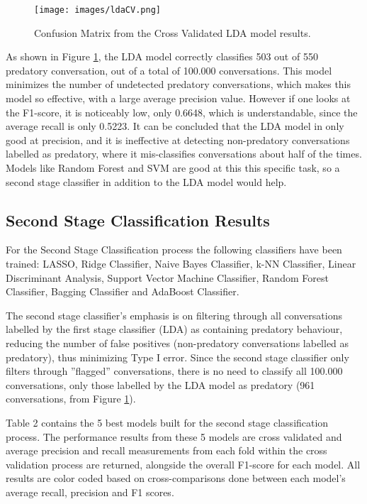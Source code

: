 \documentclass[11pt]{article}
\begin{document}
\begin{figure}[h!]
    \centering
    \texttt{[image: images/ldaCV.png]}
    \caption{Confusion Matrix from the Cross Validated LDA model results.}
    \label{fig:ldaCV}
\end{figure}

As shown in Figure \ref{fig:ldaCV}, the LDA model correctly classifies 503 out of 550 predatory conversation, out of a total of 100.000 conversations. This model minimizes the number of undetected predatory conversations, which makes this model so effective, with a large average precision value. However if one looks at the F1-score, it is noticeably low, only 0.6648, which is understandable, since the average recall is only 0.5223. It can be concluded that the LDA model in only good at precision, and it is ineffective at detecting non-predatory conversations labelled as predatory, where it mis-classifies conversations about half of the times. Models like Random Forest and SVM are good at this this specific task, so a second stage classifier in addition to the LDA model would help. 

\subsection{Second Stage Classification Results}
For the Second Stage Classification process the following classifiers have been trained: LASSO, Ridge Classifier, Naive Bayes Classifier, k-NN Classifier, Linear Discriminant Analysis, Support Vector Machine Classifier, Random Forest Classifier, Bagging Classifier and AdaBoost Classifier.

The second stage classifier's emphasis is on filtering through all conversations labelled by the first stage classifier (LDA) as containing predatory behaviour, reducing the number of false positives (non-predatory conversations labelled as predatory), thus minimizing Type I error. Since the second stage classifier only filters through ''flagged'' conversations, there is no need to classify all 100.000 conversations, only those labelled by the LDA model as predatory (961 conversations, from Figure \ref{fig:ldaCV}).

Table 2 contains the 5 best models built for the second stage classification process. The performance results from these 5 models are cross validated and average precision and recall measurements from each fold within the cross validation process are returned, alongside the overall F1-score for each model. All results are color coded based on cross-comparisons done between each model's average recall, precision and F1 scores.
\end{document}
